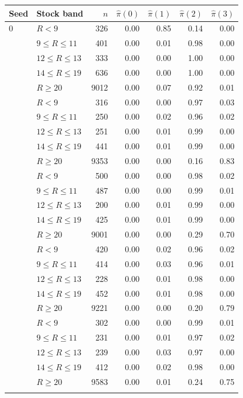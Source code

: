 \begin{tabular}{llrrrrr}
\toprule
Seed & Stock band & $n$ & $\hat\pi(0)$ & $\hat\pi(1)$ & $\hat\pi(2)$ & $\hat\pi(3)$ \\
\midrule
0 & $R<9$ & 326 & 0.00 & 0.85 & 0.14 & 0.00 \\
 & $9\le R\le 11$ & 401 & 0.00 & 0.01 & 0.98 & 0.00 \\
 & $12\le R\le 13$ & 333 & 0.00 & 0.00 & 1.00 & 0.00 \\
 & $14\le R\le 19$ & 636 & 0.00 & 0.00 & 1.00 & 0.00 \\
 & $R\ge 20$ & 9012 & 0.00 & 0.07 & 0.92 & 0.01 \\
\addlinespace
1 & $R<9$ & 316 & 0.00 & 0.00 & 0.97 & 0.03 \\
 & $9\le R\le 11$ & 250 & 0.00 & 0.02 & 0.96 & 0.02 \\
 & $12\le R\le 13$ & 251 & 0.00 & 0.01 & 0.99 & 0.00 \\
 & $14\le R\le 19$ & 441 & 0.00 & 0.01 & 0.99 & 0.00 \\
 & $R\ge 20$ & 9353 & 0.00 & 0.00 & 0.16 & 0.83 \\
\addlinespace
2 & $R<9$ & 500 & 0.00 & 0.00 & 0.98 & 0.02 \\
 & $9\le R\le 11$ & 487 & 0.00 & 0.00 & 0.99 & 0.01 \\
 & $12\le R\le 13$ & 200 & 0.00 & 0.01 & 0.99 & 0.00 \\
 & $14\le R\le 19$ & 425 & 0.00 & 0.01 & 0.99 & 0.00 \\
 & $R\ge 20$ & 9001 & 0.00 & 0.00 & 0.29 & 0.70 \\
\addlinespace
3 & $R<9$ & 420 & 0.00 & 0.02 & 0.96 & 0.02 \\
 & $9\le R\le 11$ & 414 & 0.00 & 0.03 & 0.96 & 0.01 \\
 & $12\le R\le 13$ & 228 & 0.00 & 0.01 & 0.98 & 0.00 \\
 & $14\le R\le 19$ & 452 & 0.00 & 0.01 & 0.98 & 0.00 \\
 & $R\ge 20$ & 9221 & 0.00 & 0.00 & 0.20 & 0.79 \\
\addlinespace
4 & $R<9$ & 302 & 0.00 & 0.00 & 0.99 & 0.01 \\
 & $9\le R\le 11$ & 231 & 0.00 & 0.01 & 0.97 & 0.02 \\
 & $12\le R\le 13$ & 239 & 0.00 & 0.03 & 0.97 & 0.00 \\
 & $14\le R\le 19$ & 412 & 0.00 & 0.02 & 0.98 & 0.00 \\
 & $R\ge 20$ & 9583 & 0.00 & 0.01 & 0.24 & 0.75 \\
\addlinespace
\bottomrule
\end{tabular}
